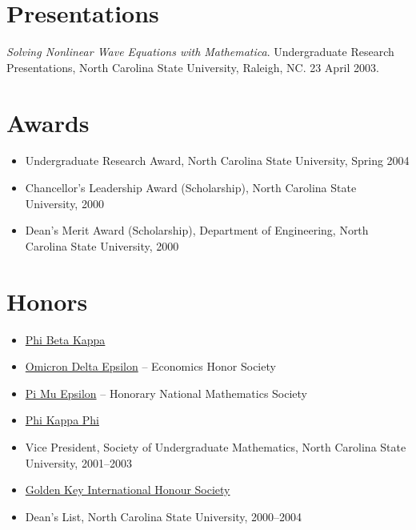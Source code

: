 \documentclass[overlapped,line,draft,11pt,letterpaper]{res}
\begin{document}
\begin{resume}
\section{\bf Presentations}

{\em Solving Nonlinear Wave Equations with Mathematica}. Undergraduate
Research Presentations, North Carolina State University, Raleigh,
NC. 23 April 2003.



\section{\bf Awards}

\begin{itemize}
\item Undergraduate Research Award, North Carolina State University,
  Spring 2004
\item Chancellor's Leadership Award (Scholarship), North Carolina State
  University, 2000
\item Dean's Merit Award (Scholarship), Department of Engineering, North
  Carolina State University, 2000
\end{itemize}


\section{\bf Honors}
\begin{itemize}
\item \href{http://www.pbk.org/}{Phi Beta Kappa}
\item \href{http://www.cba.ua.edu/~ode/}
  {Omicron Delta Epsilon} -- Economics Honor Society
\item \href{http://www.pme-math.org/}
  {Pi Mu Epsilon} -- Honorary National Mathematics Society
\item \href{http://www.phikappaphi.org/}{Phi Kappa Phi}
\item Vice President, Society of Undergraduate Mathematics, North
  Carolina State University, 2001--2003
\item \href{http://www.goldenkey.org}{Golden Key International Honour Society}
\item Dean's List, North Carolina State University, 2000--2004
\end{itemize}



\end{resume}
\end{document}
